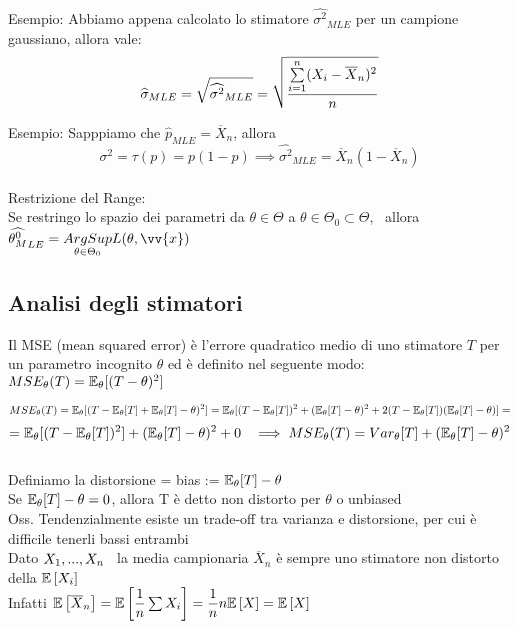 Esempio: Abbiamo appena calcolato lo stimatore $\hat{\sigma^2}_{MLE}$ per un campione gaussiano, allora vale:
\[\widehat{\sigma}_{MLE}=\sqrt{\widehat{\sigma^2}_{MLE}}=\sqrt{\dfrac{\sum\limits_{i=1}^{n}(X_i-\overline{X}_n)^2}{n}}\]

Esempio: Sapppiamo che $\hat{p}_{MLE}=\overline{X}_n$, allora
\[\sigma^2=\tau(p)=p(1-p)\implies \hat{\sigma^2}_{MLE}=\overline{X}_n(1-\overline{X}_n)\] \\




Restrizione del Range:\\
Se restringo lo spazio dei parametri da $\theta\in\Theta$ a $\theta \in \Theta_0 \subset \Theta$, \ allora \ \ $\hat{\theta^0_M}_{LE} = \underset{\theta\in\Theta_0}{ArgSup} L(\theta,\vv{x})$\\




\subsection{Analisi degli stimatori}

\begin{defi}
    Il MSE (mean squared error) è l'errore quadratico medio di uno stimatore $T$ per un parametro incognito $\theta$ ed è definito nel seguente modo: \ \ $MSE_{\theta}(T)=\mathbb E_{\theta}[(T-\theta)^2]$
\end{defi}

\[MSE_{\theta}(T)=\mathbb E_{\theta}[(T-\mathbb E_{\theta}[T]+\mathbb E_{\theta}[T]-\theta)^2]=\mathbb E_{\theta}[(T-\mathbb E_{\theta}[T])^2+(\mathbb E_{\theta}[T]-\theta)^2+2(T-\mathbb E_{\theta}[T])(\mathbb E_{\theta}[T]-\theta)] = \]\[ =\mathbb E_{\theta}[(T-\mathbb E_{\theta}[T])^2] + (\mathbb E_{\theta}[T]-\theta)^2 + 0\ \ \implies MSE_{\theta}(T)=Var_\theta[T]+(\mathbb E_{\theta}[T]-\theta)^2\]\\
%
Definiamo la distorsione = bias := $\mathbb E_{\theta}[T]-\theta $ \\
Se $\mathbb E_{\theta}[T]-\theta =0$, allora T è detto non distorto per $\theta$ o unbiased\\

Oss. Tendenzialmente esiste un trade-off tra varianza e distorsione, per cui è difficile tenerli bassi entrambi\\

Dato $X_1,...,X_n $ \ la media campionaria $ \overline{X}_n$ è sempre uno stimatore non distorto della $\mathbb{E} \left[ X_i \right]$\\
Infatti
$\mathbb{E} \left[ \overline{X}_n \right]=\mathbb{E} \left[ \dfrac{1}{n}\sum X_i \right]=\dfrac{1}{n}n\mathbb{E} \left[ X \right]=\mathbb{E} \left[ X \right]$\\

